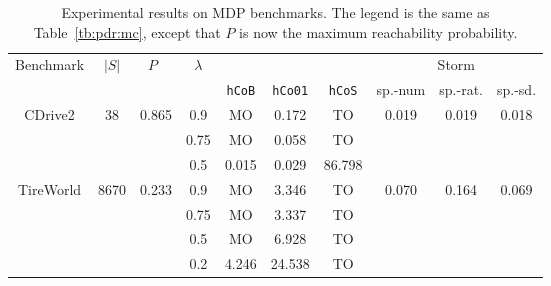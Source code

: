 \begin{table}[tb]
	\caption{Experimental results on MDP benchmarks. The legend is the same as Table~\ref{tb:pdr:mc}, except that $P$ is now the maximum reachability probability.}
	\label{tb:pdr:mdp}
	\centering
	{\small
		\begin{tabular}{cccccccccc}
			\toprule
			Benchmark                  & $|S|$                      &
			$P$\
			                           & $\lambda$
			                           & \multicolumn{3}{c}{\ADPDR}
			                           & \multicolumn{3}{c}{Storm}
			\\\cmidrule(lr){5-7}\cmidrule{8-10}
			                           &                            &                        &                         & \verb|hCoB| & \verb|hCo01| & \verb|hCoS| & sp.-num                & sp.-rat.               & sp.-sd.                \\
			\midrule\midrule
			\multirow{3}{*}{CDrive2}   & \multirow{3}{*}{38}        & \multirow{3}{*}{0.865} & 0.9                     & MO          & 0.172        & TO          & \multirow{3}{*}{0.019} & \multirow{3}{*}{0.019} & \multirow{3}{*}{0.018} \\
			                           &                            &                        & \cellcolor{gray!25}0.75 & MO          & 0.058        & TO                                                                                     \\
			                           &                            &                        & \cellcolor{gray!25}0.5  & 0.015       & 0.029        & 86.798                                                                                 \\
			\midrule
			\multirow{3}{*}{TireWorld} & \multirow{3}{*}{8670}      & \multirow{3}{*}{0.233} & 0.9                     & MO          & 3.346        & TO          & \multirow{4}{*}{0.070} & \multirow{4}{*}{0.164} & \multirow{4}{*}{0.069} \\
			                           &                            &                        & 0.75                    & MO          & 3.337        & TO                                                                                     \\
			                           &                            &                        & 0.5                     & MO          & 6.928        & TO                                                                                     \\
			                           &                            &                        & \cellcolor{gray!25}0.2  & 4.246       & 24.538       & TO                                                                                     \\
			\bottomrule
		\end{tabular}
	}
\end{table}

